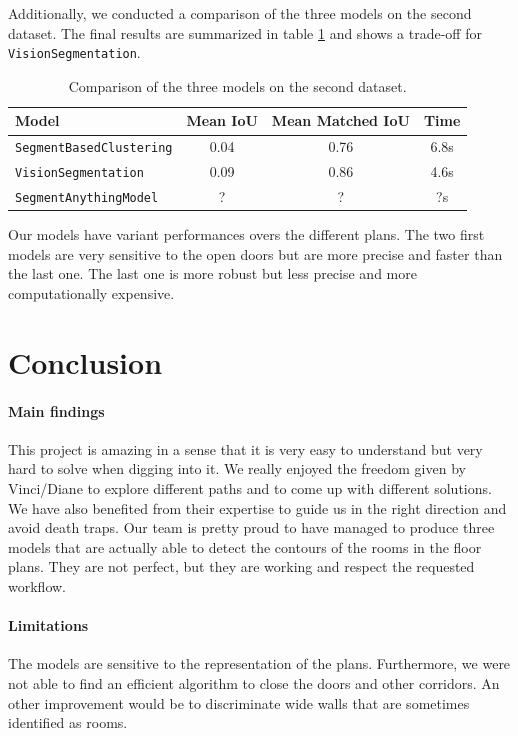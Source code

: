 \documentclass[11pt]{article}
\begin{document}
Additionally, we conducted a comparison of the three models on the second dataset.
The final results are summarized in table \ref{tab:results} and shows a trade-off 
for \texttt{VisionSegmentation}.
\begin{table}[hb!]
    \centering
    \begin{tabular}{|l|c|c|c|}
        \hline
        \textbf{Model} & \textbf{Mean IoU} & \textbf{Mean Matched IoU} & \textbf{Time} \\
        \hline
        \texttt{SegmentBasedClustering} & 0.04 & 0.76 & 6.8s \\
        \texttt{VisionSegmentation} & 0.09 & 0.86 & 4.6s \\
        \texttt{SegmentAnythingModel} & ? & ? & ?s \\
        \hline
    \end{tabular}
    \caption{Comparison of the three models on the second dataset.}
    \label{tab:results}
\end{table}

Our models have variant performances overs the different plans. The two
first models are very sensitive to the open doors but are more precise and 
faster than the last one. The last one is more robust but less precise and
more computationally expensive.

\section{Conclusion}
\paragraph{Main findings}
This project is amazing in a sense that it is very easy to understand but very hard
to solve when digging into it. We really enjoyed the freedom given by Vinci/Diane
to explore different paths and to come up with different solutions. We have
also benefited from their expertise to guide us in the right direction and avoid
death traps. 
Our team is pretty proud to have managed to produce three models that are actually able to
detect the contours of the rooms in the floor plans. They are not perfect, but
they are working and respect the requested workflow.

\paragraph{Limitations}
The models are sensitive to the representation of the plans. Furthermore, we 
were not able to find an efficient algorithm to close the doors and other corridors.
An other improvement would be to discriminate wide walls that are sometimes 
identified as rooms.
\end{document}
